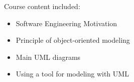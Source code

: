 Course content included:
\begin{itemize}
    \item Software Engineering Motivation
    \item Principle of object-oriented modeling
    \item Main UML diagrams
    \item Using a tool for modeling with UML
\end{itemize}